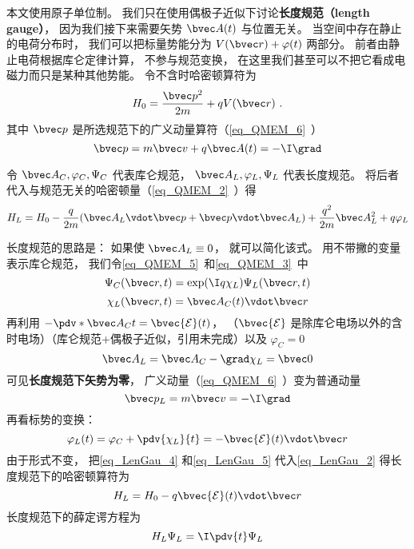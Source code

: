 

本文使用原子单位制。 我们只在使用偶极子近似下讨论\textbf{长度规范（length gauge）}， 因为我们接下来需要矢势 $\bvec A(t)$ 与位置无关。 当空间中存在静止的电荷分布时， 我们可以把标量势能分为 $V(\bvec r) + \varphi(t)$ 两部分。 前者由静止电荷根据库仑定律计算， 不参与规范变换， 在这里我们甚至可以不把它看成电磁力而只是某种其他势能。 令不含时哈密顿算符为
\begin{equation}
H_0 = \frac{\bvec p^2}{2m} + qV(\bvec r)~.
\end{equation}
其中 $\bvec p$ 是所选规范下的广义动量算符（\autoref{eq_QMEM_6}~）
\begin{equation}
\bvec p = m \bvec v + q\bvec A(t) = -\I \grad
\end{equation}

令 $\bvec A_C, \varphi_C, \Psi_C$ 代表库仑规范， $\bvec A_L, \varphi_L, \Psi_L$ 代表长度规范。 将后者代入与规范无关的哈密顿量（\autoref{eq_QMEM_2}~）得
\begin{equation}\label{eq_LenGau_2}
H_L = H_0 - \frac{q}{2m} (\bvec A_L \vdot \bvec p + \bvec p \vdot \bvec A_L)
+ \frac{q^2}{2m} \bvec A_L^2 + q \varphi_L
\end{equation}


长度规范的思路是： 如果使 $\bvec A_L \equiv 0$， 就可以简化该式。 用不带撇的变量表示库仑规范， 我们令\autoref{eq_QMEM_5}~和\autoref{eq_QMEM_3}~中
\begin{equation}\label{eq_LenGau_1}
\Psi_C(\bvec r, t) = \exp(\I q\chi_L)\Psi_L(\bvec r, t)
\end{equation}
\begin{equation}
\chi_L(\bvec r, t) = \bvec A_C(t) \vdot \bvec r
\end{equation}
再利用 $-\pdv*{\bvec A_C}{t} = \bvec {\mathcal E}(t)$， （$\bvec {\mathcal E}$ 是除库仑电场以外的含时电场）（库仑规范+偶极子近似，引用未完成）以及 $\varphi_C = 0$
\begin{equation}\label{eq_LenGau_4}
\bvec A_L = \bvec A_C - \grad \chi_L = \bvec 0
\end{equation}
可见\textbf{长度规范下矢势为零}， 广义动量（\autoref{eq_QMEM_6}~）变为普通动量
\begin{equation}\label{eq_LenGau_6}
\bvec p_L = m \bvec v = -\I \grad
\end{equation}
再看标势的变换：
\begin{equation}\label{eq_LenGau_5}
\varphi_L(t) = \varphi_C + \pdv{\chi_L}{t} = -\bvec {\mathcal E}(t) \vdot \bvec r
\end{equation}
由于形式不变， 把\autoref{eq_LenGau_4} 和\autoref{eq_LenGau_5} 代入\autoref{eq_LenGau_2} 得长度规范下的哈密顿算符为
\begin{equation}\label{eq_LenGau_7}
H_L = H_0 - q\bvec{\mathcal{E}}(t) \vdot \bvec r
\end{equation}
长度规范下的薛定谔方程为
\begin{equation}\label{eq_LenGau_3}
H_L \Psi_L = \I \pdv{t} \Psi_L
\end{equation}
